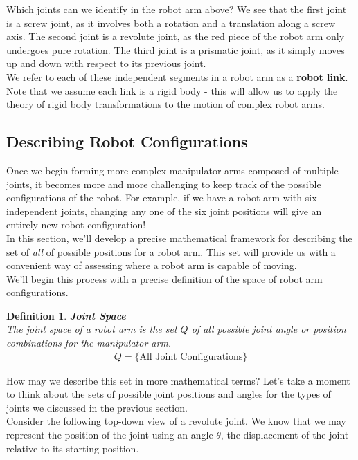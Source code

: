\documentclass[oneside]{book}
\newtheorem{definition}{Definition}
\newenvironment{defn} %
  {\colorlet{shadecolor}{orange!15}\begin{shaded}\begin{definition}}
  {\end{definition}\end{shaded}}
\begin{document}
Which joints can we identify in the robot arm above? We see that the first joint is a screw joint, as it involves both a rotation and a translation along a screw axis. The second joint is a revolute joint, as the red piece of the robot arm only undergoes pure rotation. The third joint is a prismatic joint, as it simply moves up and down with respect to its previous joint.\\
We refer to each of these independent segments in a robot arm as a \textbf{robot link}. Note that we assume each link is a rigid body - this will allow us to apply the theory of rigid body transformations to the motion of complex robot arms.

\subsection{Describing Robot Configurations}
Once we begin forming more complex manipulator arms composed of multiple joints, it becomes more and more challenging to keep track of the possible configurations of the robot. For example, if we have a robot arm with six independent joints, changing any one of the six joint positions will give an entirely new robot configuration!\\
In this section, we'll develop a precise mathematical framework for describing the set of \textit{all} of possible positions for a robot arm. This set will provide us with a convenient way of assessing where a robot arm is capable of moving.\\
We'll begin this process with a precise definition of the space of robot arm configurations.
\begin{defn}
\textbf{Joint Space}\\
The joint space of a robot arm is the set $Q$ of all possible joint angle or position combinations for the manipulator arm.
\begin{align}
    Q = \{\text{All Joint Configurations}\}
\end{align}
\end{defn}
\noindent
How may we describe this set in more mathematical terms? Let's take a moment to think about the sets of possible joint positions and angles for the types of joints we discussed in the previous section.\\
Consider the following top-down view of a revolute joint. We know that we may represent the position of the joint using an angle $\theta$, the displacement of the joint relative to its starting position.
\end{document}
